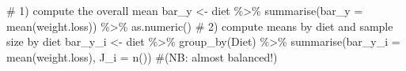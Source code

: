 \documentclass[
  letterpaper,
  DIV=11,
  numbers=noendperiod]{scrreprt}
\newenvironment{Shaded}{\begin{snugshade}}{\end{snugshade}}
\newcommand{\AttributeTok}[1]{\textcolor[rgb]{0.40,0.45,0.13}{#1}}
\newcommand{\CommentTok}[1]{\textcolor[rgb]{0.37,0.37,0.37}{#1}}
\newcommand{\FunctionTok}[1]{\textcolor[rgb]{0.28,0.35,0.67}{#1}}
\newcommand{\NormalTok}[1]{\textcolor[rgb]{0.00,0.23,0.31}{#1}}
\newcommand{\OtherTok}[1]{\textcolor[rgb]{0.00,0.23,0.31}{#1}}
\newcommand{\SpecialCharTok}[1]{\textcolor[rgb]{0.37,0.37,0.37}{#1}}
\begin{document}
\begin{Shaded}
\begin{Highlighting}[]
\CommentTok{\# 1) compute the overall mean}
\NormalTok{bar\_y }\OtherTok{\textless{}{-}}\NormalTok{ diet }\SpecialCharTok{\%\textgreater{}\%} 
  \FunctionTok{summarise}\NormalTok{(}\AttributeTok{bar\_y =} \FunctionTok{mean}\NormalTok{(weight.loss)) }\SpecialCharTok{\%\textgreater{}\%} 
  \FunctionTok{as.numeric}\NormalTok{()}
\CommentTok{\# 2) compute means by diet and sample size by diet}
\NormalTok{bar\_y\_i }\OtherTok{\textless{}{-}}\NormalTok{ diet }\SpecialCharTok{\%\textgreater{}\%} 
  \FunctionTok{group\_by}\NormalTok{(Diet) }\SpecialCharTok{\%\textgreater{}\%} 
  \FunctionTok{summarise}\NormalTok{(}\AttributeTok{bar\_y\_i =} \FunctionTok{mean}\NormalTok{(weight.loss),}
            \AttributeTok{J\_i =} \FunctionTok{n}\NormalTok{())}
\CommentTok{\#(NB: almost balanced!)}


\end{Highlighting}
\end{Shaded}
\end{document}
